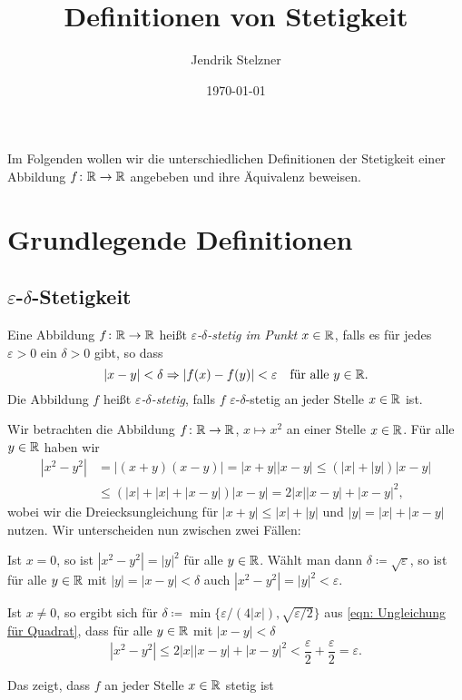 \documentclass[a4paper,10pt]{article}
\title{Definitionen von Stetigkeit}
\author{Jendrik Stelzner}
\date{\today}
\begin{document}
\maketitle


Im Folgenden wollen wir die unterschiedlichen Definitionen der Stetigkeit einer Abbildung $f \colon \mathbb{R} \to \mathbb{R}$ angebeben und ihre Äquivalenz beweisen.


\tableofcontents





\section{Grundlegende Definitionen}


\subsection{$\varepsilon$-$\delta$-Stetigkeit}

\begin{defi}
 Eine Abbildung $f \colon \mathbb{R} \to \mathbb{R}$ heißt \emph{$\varepsilon$-$\delta$-stetig im Punkt $x \in \mathbb{R}$}, falls es für jedes $\varepsilon > 0$ ein $\delta > 0$ gibt, so dass
 \[
  |x-y| < \delta \Rightarrow |f(x)-f(y)| < \varepsilon \quad \text{für alle $y \in \mathbb{R}$}.
 \]
 Die Abbildung $f$ heißt \emph{$\varepsilon$-$\delta$-stetig}, falls $f$ $\varepsilon$-$\delta$-stetig an jeder Stelle $x \in \mathbb{R}$ ist.
\end{defi}

\begin{bsp}
 Wir betrachten die Abbildung $f \colon \mathbb{R} \to \mathbb{R}$, $x \mapsto x^2$ an einer Stelle $x \in \mathbb{R}$. Für alle $y \in \mathbb{R}$ haben wir
 \begin{equation}\label{eqn: Ungleichung für Quadrat}
  \begin{aligned}
   \left| x^2 - y^2 \right|
   &= |(x+y)(x-y)|
   = |x+y||x-y|
   \leq (|x|+|y|)|x-y| \\
   &\leq (|x|+|x|+|x-y|)|x-y|
   = 2|x||x-y| + |x-y|^2,
  \end{aligned}
 \end{equation}
 wobei wir die Dreiecksungleichung für \mbox{$|x+y| \leq |x| + |y|$} und \mbox{$|y| = |x| + |x-y|$} nutzen. Wir unterscheiden nun zwischen zwei Fällen:
 
 Ist $x = 0$, so ist $|x^2 - y^2| = |y|^2$ für alle $y \in \mathbb{R}$. Wählt man dann $\delta \coloneqq \sqrt{\varepsilon}$, so ist für alle $y \in \mathbb{R}$ mit $|y| = |x-y| < \delta$ auch $|x^2-y^2| = |y|^2 < \varepsilon$.
 
 Ist $x \neq 0$, so ergibt sich für $\delta \coloneqq \min\{ \varepsilon/(4|x|), \sqrt{\varepsilon/2} \}$ aus \eqref{eqn: Ungleichung für Quadrat}, dass für alle $y \in \mathbb{R}$ mit $|x-y| < \delta$
 \[
  \left| x^2 - y^2 \right| \leq 2|x||x-y| + |x-y|^2 < \frac{\varepsilon}{2} + \frac{\varepsilon}{2} = \varepsilon.
 \]
 
 Das zeigt, dass $f$ an jeder Stelle $x \in \mathbb{R}$ stetig ist
\end{bsp}
\end{document}
